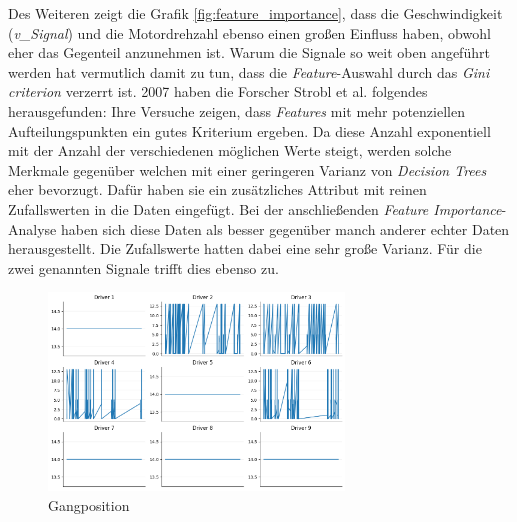 Des Weiteren zeigt die Grafik \ref{fig:feature_importance}, dass die Geschwindigkeit (\textit{v\_Signal}) und die Motordrehzahl ebenso einen großen Einfluss haben, obwohl eher das Gegenteil anzunehmen ist. Warum die Signale so weit oben angeführt werden hat vermutlich damit zu tun, dass die \textit{Feature}-Auswahl durch das \textit{Gini criterion} verzerrt ist. 2007 haben die Forscher Strobl et al. \cite{Strobl2007} folgendes herausgefunden: Ihre Versuche zeigen, dass \textit{Features} mit mehr potenziellen Aufteilungspunkten ein gutes Kriterium ergeben. Da diese Anzahl exponentiell mit der Anzahl der verschiedenen möglichen Werte steigt, werden solche Merkmale gegenüber welchen mit einer geringeren Varianz von \textit{Decision Trees} eher bevorzugt. Dafür haben sie ein zusätzliches Attribut mit reinen Zufallswerten in die Daten eingefügt. Bei der anschließenden \textit{Feature Importance}-Analyse haben sich diese Daten als besser gegenüber manch anderer echter Daten herausgestellt. Die Zufallswerte hatten dabei eine sehr große Varianz. Für die zwei genannten Signale trifft dies ebenso zu.

\begin{figure}[htbp]
  \centering
  \includegraphics[width=0.7\textwidth]{images/gear_position.png}
  \caption{Gangposition}
  \label{fig:gear_position}
\end{figure}


